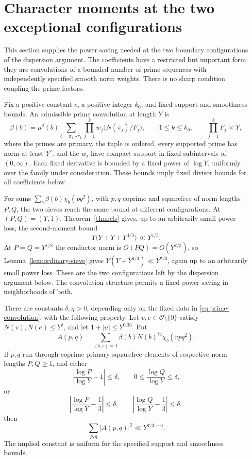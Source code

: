 \section{Character moments at the two exceptional configurations}
\label{sec:dual}

This section supplies the power saving needed at the two boundary
configurations of the dispersion argument.  The coefficients have a
restricted but important form: they are convolutions of a bounded number
of prime sequences with independently specified smooth norm weights.
There is no sharp condition coupling the prime factors.

Fix a positive constant $c$, a positive integer $k_0$, and fixed support
and smoothness bounds.  An admissible prime convolution at length $Y$ is
\begin{equation}
 \beta(b)=\mu^2(b)
 \sum_{b=\pi_1\cdots\pi_k}
       \prod_{j=1}^k w_j\bigl(N(\pi_j)/F_j\bigr),
 \qquad 1\le k\le k_0,\qquad \prod_{j=1}^k F_j\asymp Y,
 \label{eq:prime-convolution}
\end{equation}
where the primes are primary, the tuple is ordered, every supported prime
has norm at least $Y^c$, and the $w_j$ have compact support in fixed
subintervals of $(0,\infty)$.  Each fixed derivative is bounded by a fixed
power of $\log Y$, uniformly over the family under consideration.  These
bounds imply fixed divisor bounds for all coefficients below.

For sums $\sum_b\beta(b)\chi_b(pq^2)$, with $p,q$ coprime and
squarefree of norm lengths $P,Q$, the two sieves reach the same bound
at different configurations. At $(P,Q)=(Y,1)$,
Theorem~\ref{thm:cls} gives, up to an arbitrarily small power loss,
the second-moment bound
\[
 Y\bigl(Y+Y+Y^{4/3}\bigr)\ll Y^{7/3}.
\]
At $P=Q=Y^{1/3}$ the conductor norm is $O(PQ)=O(Y^{2/3})$, so
Lemma~\ref{lem:ordinary-sieve} gives $Y(Y+Y^{4/3})\ll Y^{7/3}$,
again up to an arbitrarily small power loss. These are the two
configurations left by the dispersion argument below. The convolution
structure permits a fixed power saving in neighborhoods of both.

\begin{proposition}
\label{prop:dual}
There are constants $\delta,\eta>0$, depending only on the fixed data in
\eqref{eq:prime-convolution}, with the following property.  Let
$v,e\in\mathcal O\setminus\{0\}$ satisfy
$N(v),N(e)\le Y^\delta$, and let $1+|u|\le Y^{0.36}$.  Put
\[
 A(p,q)=\sum_{(b,e)=1}\beta(b)N(b)^{iu}\chi_b(vpq^2).
\]
If $p,q$ run through coprime primary squarefree elements of respective
norm lengths $P,Q\ge1$, and either
\[
 \left|\frac{\log P}{\log Y}-1\right|\le\delta,
 \qquad 0\le\frac{\log Q}{\log Y}\le\delta,
\]
or
\[
 \left|\frac{\log P}{\log Y}-\frac13\right|\le\delta,
 \qquad
 \left|\frac{\log Q}{\log Y}-\frac13\right|\le\delta,
\]
then
\begin{equation}
 \sum_{p,q}|A(p,q)|^2\ll Y^{7/3-\eta}.
 \label{eq:exceptional-moment}
\end{equation}
The implied constant is uniform for the specified support and
smoothness bounds.
\end{proposition}

